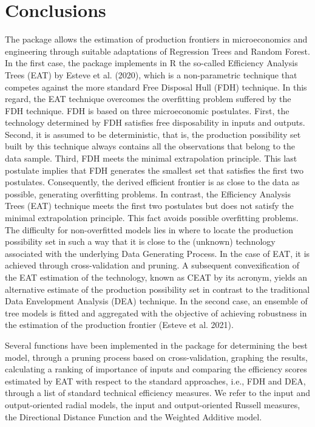 \hypertarget{section7}{%
\section{Conclusions}\label{section7}}

The  package allows the estimation of production frontiers in microeconomics and engineering through suitable adaptations of Regression Trees and Random Forest. In the first case, the package implements in R the so-called Efficiency Analysis Trees (EAT) by Esteve et al. (2020), which is a non-parametric technique that competes against the more standard Free Disposal Hull (FDH) technique. In this regard, the EAT technique overcomes the overfitting problem suffered by the FDH technique. FDH is based on three microeconomic postulates. First, the technology determined by FDH satisfies free disposability in inputs and outputs. Second, it is assumed to be deterministic, that is, the production possibility set built by this technique always contains all the observations that belong to the data sample. Third, FDH meets the minimal extrapolation principle. This last postulate implies that FDH generates the smallest set that satisfies the first two postulates. Consequently, the derived efficient frontier is as close to the data as possible, generating overfitting problems. In contrast, the Efficiency Analysis Trees (EAT) technique meets the first two postulates but does not satisfy the minimal extrapolation principle. This fact avoids possible overfitting problems. The difficulty for non-overfitted models lies in where to locate the production possibility set in such a way that it is close to the (unknown) technology associated with the underlying Data Generating Process. In the case of EAT, it is achieved through cross-validation and pruning. A subsequent convexification of the EAT estimation of the technology, known as CEAT by its acronym, yields an alternative estimate of the production possibility set in contrast to the traditional Data Envelopment Analysis (DEA) technique. In the second case, an ensemble of tree models is fitted and aggregated with the objective of achieving robustness in the estimation of the production frontier (Esteve et al. 2021).

Several functions have been implemented in the  package for determining the best model, through a pruning process based on cross-validation, graphing the results, calculating a ranking of importance of inputs and comparing the efficiency scores estimated by EAT with respect to the standard approaches, i.e., FDH and DEA, through a list of standard technical efficiency measures. We refer to the input and output-oriented radial models, the input and output-oriented Russell measures, the Directional Distance Function and the Weighted Additive model.

